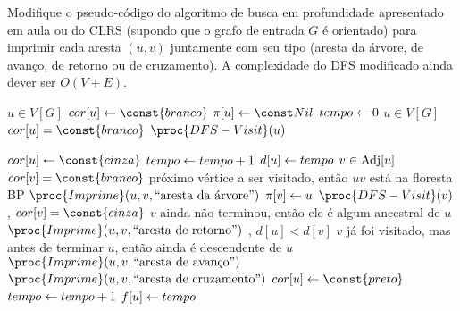 Modifique o pseudo-código do algoritmo de busca em profundidade apresentado em aula ou do CLRS (supondo que o grafo de entrada $G$ é orientado) para imprimir cada aresta $(u, v)$ juntamente com seu tipo (aresta da árvore, de avanço, de retorno ou de cruzamento). A complexidade do DFS modificado ainda dever ser $O(V + E)$.

\itemdsep

\newcommand{\Branco}{\const{branco}\xspace}
\newcommand{\Cinza}{\const{cinza}\xspace}
\newcommand{\Preto}{\const{preto}\xspace}

\begin{codebox}
\li \Para \Cada $u \in V[G]$ \Faca
    \Do
\li     $cor[u] \Recebe \Branco$
\li     $\pi[u] \Recebe \Nulo$
    \End
\li $tempo \leftarrow 0$
\li \Para \Cada $u \in V[G]$ \Faca
    \Do
\li     \Se $cor[u] = \Branco$
        \Do
\li         \Entao $\proc{DFS-Visit}(u)$
        \End
    \End
\end{codebox}

\begin{codebox}
\li $cor[u] \Recebe \Cinza$
\li $tempo \leftarrow tempo + 1$
\li $d[u] \leftarrow tempo$
\li \Para \Cada $v \in \operatorname{Adj}[u]$
    \Do
\li     \Se $cor[v] = \Branco$ \Entao
\li     \Comment próximo vértice a ser visitado, então $uv$ está na floresta BP
        \Do
\li         $\proc{Imprime}(u, v, \text{``aresta da árvore''})$
\li
\li         $\pi[v] \leftarrow u$
\li         $\proc{DFS-Visit}(v)$
        \End
\li     \Senao, \Se $cor[v] = \Cinza$ \Entao
\li     \Comment $v$ ainda não terminou, então ele é algum ancestral de $u$
        \Do
\li         $\proc{Imprime}(u, v, \text{``aresta de retorno''})$
        \End
\li     \Senao, \Se $d[u] < d[v]$ \Entao
\li     \Comment $v$ já foi visitado, mas antes de terminar $u$, então ainda é descendente de $u$
        \Do
\li         $\proc{Imprime}(u, v, \text{``aresta de avanço''})$
        \End
\li     \Senao
        \Do
\li         $\proc{Imprime}(u, v, \text{``aresta de cruzamento''})$
        \End
    \End
\li $cor[u] \Recebe \Preto$
\li $tempo \leftarrow tempo + 1$
\li $f[u] \leftarrow tempo$
\end{codebox}
